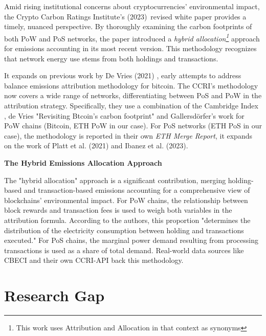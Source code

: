 \documentclass[11pt]{report}
\begin{document}
Amid rising institutional concerns about cryptocurrencies' environmental impact, the Crypto Carbon Ratings Institute's (2023)\ revised white paper provides a timely, nuanced perspective. By thoroughly examining the carbon footprints of both PoW and PoS networks, the paper introduced a \textit{hybrid allocation\footnote{This work uses Attribution and Allocation in that context as synonyms}} approach for emissions accounting in its most recent version. This methodology recognizes that network energy use stems from both holdings and transactions.

It expands on previous work by De Vries (2021) \cite{devriesTrueCostsDigital2021}, early attempts to address balance emissions attribution methodology for bitcoin. The CCRI's methodology now covers a wide range of networks, differentiating between PoS and PoW in the attribution strategy. Specifically, they use a combination of the Cambridge Index \cite{neumuellerCambridgeBitcoinElectricity2021}, de Vries "Revisiting Btcoin's carbon footprint" \cite{devriesRevisitingBitcoinCarbon2022} and Gallersdörfer's work \cite{gallersdorferEnergyConsumptionCryptocurrencies2020} for PoW chains (Bitcoin, ETH PoW in our case). For PoS networks (ETH PoS in our case), the methodology is reported in their own \textit{ETH Merge Report}\cite{ETHMergeReport}, it expands on the work of Platt et al. (2021)\cite{plattEnergyFootprintBlockchain2021} and Ibanez et al. (2023)\cite{ibanezEnergyConsumptionProofofStake2023}.

\textbf{The Hybrid Emissions Allocation Approach}

The "hybrid allocation" approach is a significant contribution, merging holding-based and transaction-based emissions accounting for a comprehensive view of blockchains' environmental impact. For PoW chains, the relationship between block rewards and transaction fees is used to weigh both variables in the attribution formula. According to the authors, this proportion "determines the distribution of the electricity consumption between holding and transactions executed." For PoS chains, the marginal power demand resulting from processing transactions is used as a share of total demand. Real-world data sources like CBECI and their own CCRI-API back this methodology.



\section{Research Gap}
\end{document}
